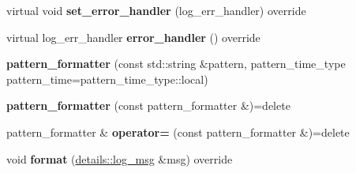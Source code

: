 \begin{DoxyCompactItemize}
\item 
virtual void {\bfseries set\+\_\+error\+\_\+handler} (log\+\_\+err\+\_\+handler) override\hypertarget{classspdlog_1_1SPDLOG__FINAL_af336d7e05074c0156f44fac525edcec9}{}\label{classspdlog_1_1SPDLOG__FINAL_af336d7e05074c0156f44fac525edcec9}

\item 
virtual log\+\_\+err\+\_\+handler {\bfseries error\+\_\+handler} () override\hypertarget{classspdlog_1_1SPDLOG__FINAL_ac78a7f969a36a69189a532af74c7de16}{}\label{classspdlog_1_1SPDLOG__FINAL_ac78a7f969a36a69189a532af74c7de16}

\item 
{\bfseries pattern\+\_\+formatter} (const std\+::string \&pattern, pattern\+\_\+time\+\_\+type pattern\+\_\+time=pattern\+\_\+time\+\_\+type\+::local)\hypertarget{classspdlog_1_1SPDLOG__FINAL_a3388a4dfd79ae9d33ef6624991ec79f6}{}\label{classspdlog_1_1SPDLOG__FINAL_a3388a4dfd79ae9d33ef6624991ec79f6}

\item 
{\bfseries pattern\+\_\+formatter} (const pattern\+\_\+formatter \&)=delete\hypertarget{classspdlog_1_1SPDLOG__FINAL_a3a25ed84ba28f3efc1e751ec61d4c497}{}\label{classspdlog_1_1SPDLOG__FINAL_a3a25ed84ba28f3efc1e751ec61d4c497}

\item 
pattern\+\_\+formatter \& {\bfseries operator=} (const pattern\+\_\+formatter \&)=delete\hypertarget{classspdlog_1_1SPDLOG__FINAL_a87ac07fbf23b47b7951108a99f29b1f5}{}\label{classspdlog_1_1SPDLOG__FINAL_a87ac07fbf23b47b7951108a99f29b1f5}

\item 
void {\bfseries format} (\hyperlink{structspdlog_1_1details_1_1log__msg}{details\+::log\+\_\+msg} \&msg) override\hypertarget{classspdlog_1_1SPDLOG__FINAL_a2cebe817331a75c381428afb4c994989}{}\label{classspdlog_1_1SPDLOG__FINAL_a2cebe817331a75c381428afb4c994989}

\end{DoxyCompactItemize}
